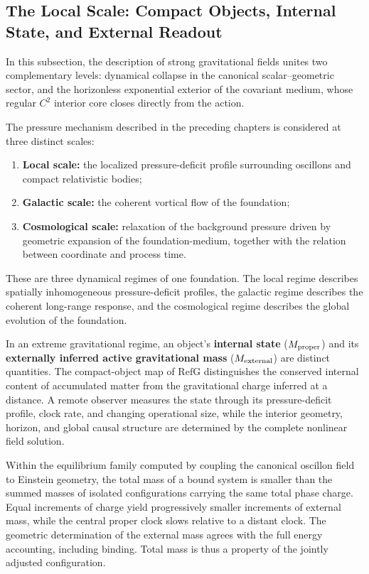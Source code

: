 \documentclass[11pt,a4paper]{article}
\newcommand{\RefG}{\mathrm{RefG}}
\begin{document}
\subsection{The Local Scale: Compact Objects, Internal State, and External Readout}

In this subsection, the description of strong gravitational fields unites two complementary levels: dynamical collapse in the canonical scalar--geometric sector, and the horizonless exponential exterior of the covariant medium, whose regular $C^2$ interior core closes directly from the action.

The pressure mechanism described in the preceding chapters is considered at three distinct scales:
\begin{enumerate}[label=\arabic*.]
\item \textbf{Local scale:} the localized pressure-deficit profile surrounding oscillons and compact relativistic bodies;
\item \textbf{Galactic scale:} the coherent vortical flow of the foundation;
\item \textbf{Cosmological scale:} relaxation of the background pressure driven by geometric expansion of the foundation-medium, together with the relation between coordinate and process time.
\end{enumerate}

These are three dynamical regimes of one foundation. The local regime describes spatially inhomogeneous pressure-deficit profiles, the galactic regime describes the coherent long-range response, and the cosmological regime describes the global evolution of the foundation.

In an extreme gravitational regime, an object's \textbf{internal state} ($M_{\rm proper}$) and its \textbf{externally inferred active gravitational mass} ($M_{\rm external}$) are distinct quantities. The compact-object map of $\RefG$ distinguishes the conserved internal content of accumulated matter from the gravitational charge inferred at a distance. A remote observer measures the state through its pressure-deficit profile, clock rate, and changing operational size, while the interior geometry, horizon, and global causal structure are determined by the complete nonlinear field solution.

Within the equilibrium family computed by coupling the canonical oscillon field to Einstein geometry, the total mass of a bound system is smaller than the summed masses of isolated configurations carrying the same total phase charge. Equal increments of charge yield progressively smaller increments of external mass, while the central proper clock slows relative to a distant clock. The geometric determination of the external mass agrees with the full energy accounting, including binding. Total mass is thus a property of the jointly adjusted configuration.
\end{document}
